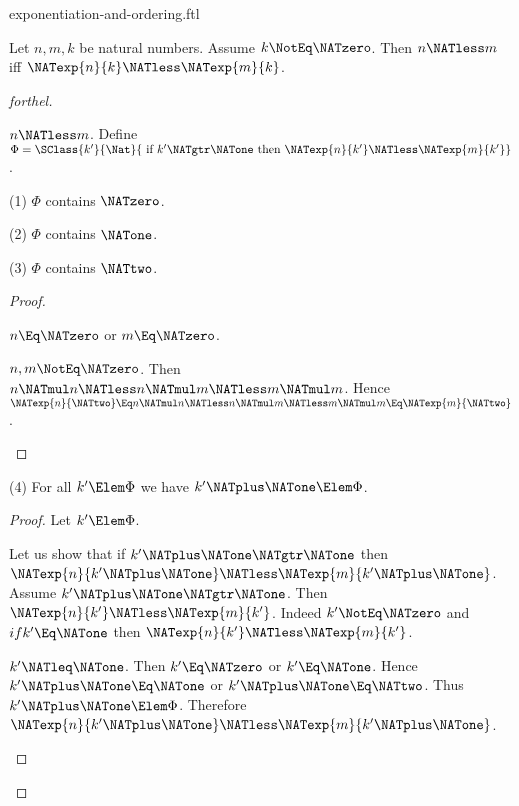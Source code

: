 \documentclass{stex}
\begin{document}
\begin{smodule}{exponentiation-and-ordering.ftl}

\begin{proposition}[forthel,id=ARITHMETIC_09_3373702288769024]
  Let $n, m, k$ be natural numbers.
  Assume $k \NotEq \NATzero$.
  Then $n \NATless m$ iff $\NATexp{n}{k} \NATless \NATexp{m}{k}$.
\end{proposition}
\begin{proof}[forthel]
  \begin{case}{$n \NATless m$.}
    Define $\Phi = \SClass{k'}{\Nat}{\text{ if }k' \NATgtr \NATone\text{ then }\NATexp{n}{k'} \NATless \NATexp{m}{k'}}$.

    (1) $\Phi$ contains $\NATzero$.

    (2) $\Phi$ contains $\NATone$.

    (3) $\Phi$ contains $\NATtwo$.
    \begin{proof}
      \begin{case}{$n \Eq \NATzero$ or $m \Eq \NATzero$.} \end{case}

      \begin{case}{$n, m \NotEq \NATzero$.}
        Then $n \NATmul n
          \NATless n \NATmul m
          \NATless m \NATmul m$.
        Hence $\NATexp{n}{\NATtwo}
          \Eq n \NATmul n
          \NATless n \NATmul m
          \NATless m \NATmul m
          \Eq \NATexp{m}{\NATtwo}$.
      \end{case}
    \end{proof}

    (4) For all $k' \Elem \Phi$ we have $k' \NATplus \NATone \Elem \Phi$.
    \begin{proof}
      Let $k' \Elem \Phi$.

      Let us show that if $k' \NATplus \NATone \NATgtr \NATone$ then $\NATexp{n}{k' \NATplus \NATone} \NATless \NATexp{m}{k' \NATplus \NATone}$.
        Assume $k' \NATplus \NATone \NATgtr \NATone$.
        Then $\NATexp{n}{k'} \NATless \NATexp{m}{k'}$.
        Indeed $k' \NotEq \NATzero$ and $if k' \Eq \NATone$ then $\NATexp{n}{k'} \NATless \NATexp{m}{k'}$.

        \begin{case}{$k' \NATleq \NATone$.}
          Then $k' \Eq \NATzero$ or $k' \Eq \NATone$.
          Hence $k' \NATplus \NATone \Eq \NATone$ or $k' \NATplus \NATone \Eq \NATtwo$.
          Thus $k' \NATplus \NATone \Elem \Phi$.
          Therefore $\NATexp{n}{k' \NATplus \NATone} \NATless \NATexp{m}{k' \NATplus \NATone}$.
        \end{case}


\end{proof}
\end{case}
\end{proof}
\end{smodule}
\end{document}
